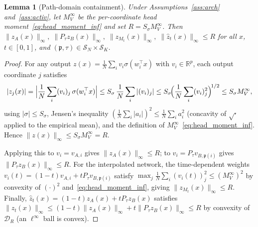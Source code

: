 \documentclass[11pt]{article}
\newtheorem{lemma}[theorem]{Lemma}
\newcommand{\R}{\mathbb{R}}
\newcommand{\cS}{\mathcal{S}}
\newcommand{\cB}{\mathcal{B}}
\newcommand{\cD}{\mathcal{D}}  %
\newcommand{\nperm}{\mathfrak{p}}  %
\begin{document}
\begin{lemma}[Path-domain containment]\label{lem:auto_path_domain}
Under Assumptions~\ref{ass:arch} and~\ref{ass:activ},
let $M_V^\infty$ be the per-coordinate head moment~\eqref{eq:head_moment_inf}
and set $R = S_\sigma M_V^\infty$.
Then
$\|z_A(x)\|_\infty,\;\|P_\tau z_B(x)\|_\infty,\;
\|z_{M_t}(x)\|_\infty,\;\|\hat z_t(x)\|_\infty \le R$ for all
$x$, $t \in [0,1]$, and $(\nperm, \tau) \in \cS_N \times \cS_K$.
\end{lemma}
\begin{proof}
For any output $z(x) = \frac{1}{N}\sum_i v_i \sigma(w_i^\top x)$ with
$v_i \in \R^{p}$, each output coordinate $j$ satisfies
\[
  |z_j(x)|
  = \Bigl|\frac{1}{N}\sum_i (v_i)_j\,\sigma(w_i^\top x)\Bigr|
  \le S_\sigma\,\frac{1}{N}\sum_i |(v_i)_j|
  \le S_\sigma\!\Bigl(\frac{1}{N}\sum_i (v_i)_j^2\Bigr)^{\!1/2}
  \le S_\sigma M_V^\infty,
\]
using $|\sigma|\le S_\sigma$, Jensen's inequality
$(\frac{1}{N}\sum_i |a_i|)^2 \le \frac{1}{N}\sum_i a_i^2$
(concavity of $\sqrt{\cdot}$ applied to the empirical mean), and the definition of
$M_V^\infty$~\eqref{eq:head_moment_inf}.
Hence $\|z(x)\|_\infty \le S_\sigma M_V^\infty = R$.

Applying this to $v_i = v_{A,i}$ gives $\|z_A(x)\|_\infty \le R$;
to $v_i = P_\tau v_{B,\nperm(i)}$ gives $\|P_\tau z_B(x)\|_\infty \le R$.
For the interpolated network, the time-dependent weights
$v_i(t) = (1-t)v_{A,i} + tP_\tau v_{B,\nperm(i)}$ satisfy
$\max_j \frac{1}{N}\sum_i (v_i(t))_j^2 \le (M_V^\infty)^2$ by convexity
of $(\cdot)^2$ and~\eqref{eq:head_moment_inf}, giving
$\|z_{M_t}(x)\|_\infty \le R$.
Finally, $\hat z_t(x) = (1-t)z_A(x)+tP_\tau z_B(x)$ satisfies
$\|\hat z_t(x)\|_\infty \le (1-t)\|z_A(x)\|_\infty+t\|P_\tau z_B(x)\|_\infty
\le R$ by convexity of $\cD_R$ (an $\ell^\infty$ ball is convex).
\end{proof}
\end{document}
